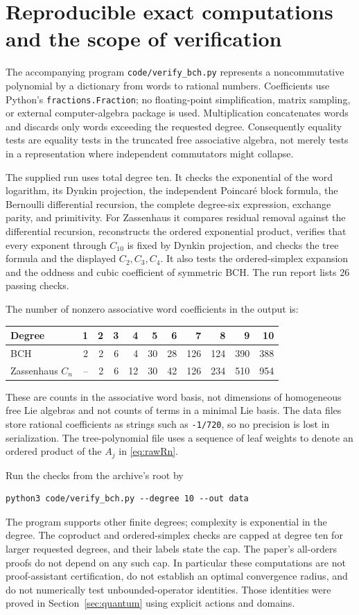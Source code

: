 \documentclass[11pt]{article}
\theoremstyle{definition}
\theoremstyle{remark}
\numberwithin{equation}{section}
\begin{document}
\section{Reproducible exact computations and the scope of verification}\label{sec:verification}
The accompanying program \texttt{code/verify\_bch.py} represents a noncommutative polynomial by a dictionary from words to rational numbers. Coefficients use Python's \texttt{fractions.Fraction}; no floating-point simplification, matrix sampling, or external computer-algebra package is used. Multiplication concatenates words and discards only words exceeding the requested degree. Consequently equality tests are equality tests in the truncated free associative algebra, not merely tests in a representation where independent commutators might collapse.

The supplied run uses total degree ten. It checks the exponential of the word logarithm, its Dynkin projection, the independent Poincar\'e block formula, the Bernoulli differential recursion, the complete degree-six expression, exchange parity, and primitivity. For Zassenhaus it compares residual removal against the differential recursion, reconstructs the ordered exponential product, verifies that every exponent through $C_{10}$ is fixed by Dynkin projection, and checks the tree formula and the displayed $C_2,C_3,C_4$. It also tests the ordered-simplex expansion and the oddness and cubic coefficient of symmetric BCH. The run report lists 26 passing checks.

The number of nonzero associative word coefficients in the output is:
\begin{center}
\begin{tabular}{lrrrrrrrrrr}
\toprule
Degree&1&2&3&4&5&6&7&8&9&10\\
\midrule
BCH&2&2&6&4&30&28&126&124&390&388\\
Zassenhaus $C_n$&--&2&6&12&30&42&126&234&510&954\\
\bottomrule
\end{tabular}
\end{center}
These are counts in the associative word basis, not dimensions of homogeneous free Lie algebras and not counts of terms in a minimal Lie basis. The data files store rational coefficients as strings such as \texttt{-1/720}, so no precision is lost in serialization. The tree-polynomial file uses a sequence of leaf weights to denote an ordered product of the $A_j$ in \eqref{eq:rawRn}.

Run the checks from the archive's root by
\begin{verbatim}
python3 code/verify_bch.py --degree 10 --out data
\end{verbatim}
The program supports other finite degrees; complexity is exponential in the degree. The coproduct and ordered-simplex checks are capped at degree ten for larger requested degrees, and their labels state the cap. The paper's all-orders proofs do not depend on any such cap. In particular these computations are not proof-assistant certification, do not establish an optimal convergence radius, and do not numerically test unbounded-operator identities. Those identities were proved in Section~\ref{sec:quantum} using explicit actions and domains.
\end{document}
